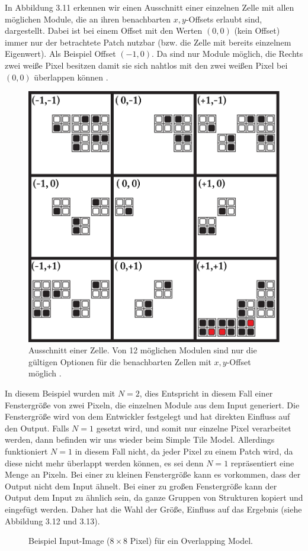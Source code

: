 \documentclass[12pt, a4paper,twoside,openany]{report} %
\begin{document}
In Abbildung 3.11 erkennen wir einen Ausschnitt einer einzelnen Zelle mit allen möglichen Module, die an ihren benachbarten $x,y$-Offsets erlaubt sind, dargestellt.
Dabei ist bei einem Offset mit den Werten $(0,0)$ {(kein Offset)} immer nur der betrachtete Patch nutzbar {(bzw. die Zelle mit bereits einzelnem Eigenwert)}.
Als Beispiel Offset $(-1,0)$. Da sind nur Module möglich, die Rechts zwei weiße Pixel besitzen damit sie sich nahtlos mit den zwei weißen Pixel bei $(0,0)$ überlappen können \cite{Karth2017WaveFunctionCollapseIC}.

\begin{figure}[H]
    \centering
    \includegraphics[width=0.5\linewidth]{images/red-maze-offset-example.png}%
    \caption{Ausschnitt einer Zelle. Von 12 möglichen Modulen sind nur die gültigen Optionen für die benachbarten Zellen mit $x,y$-Offset möglich \cite{Karth2017WaveFunctionCollapseIC}.}%
\end{figure}

In diesem Beispiel wurden mit $N = 2$, dies Entspricht in diesem Fall einer Fenstergröße von zwei Pixeln, die einzelnen Module aus dem Input generiert.
Die Fenstergröße wird von dem Entwickler festgelegt und hat direkten Einfluss auf den Output.
Falls $N = 1$ gesetzt wird, und somit nur einzelne Pixel verarbeitet werden, dann befinden wir uns wieder beim Simple Tile Model.
Allerdings funktioniert $N = 1$ in diesem Fall nicht, da jeder Pixel zu einem Patch wird, da diese nicht mehr überlappt werden können,
es sei denn $N = 1$ repräsentiert eine Menge an Pixeln.
Bei einer zu kleinen Fenstergröße kann es vorkommen, dass der Output nicht dem Input ähnelt.
Bei einer zu großen Fenstergröße kann der Output dem Input zu ähnlich sein, da ganze Gruppen von Strukturen kopiert und eingefügt werden.
Daher hat die Wahl der Größe, Einfluss auf das Ergebnis {(siehe Abbildung 3.12 und 3.13)}.

\begin{figure}[H]
    \centering
    \caption{Beispiel Input-Image ($8\times8$ Pixel) für ein Overlapping Model.}%
\end{figure}
\end{document}
